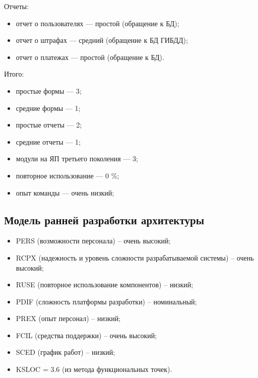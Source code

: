 Отчеты:
\begin{itemize}[label = ---]
    \item отчет о пользователях --- простой (обращение к БД);
    \item отчет о штрафах --- средний (обращение к БД ГИБДД);
    \item отчет о платежах --- простой (обращение к БД).
\end{itemize}

Итого:
\begin{itemize}[label = ---]
    \item простые формы --- 3;
    \item средние формы --- 1;

    \item простые отчеты --- 2;
    \item средние отчеты --- 1;

    \item модули на ЯП третьего поколения --- 3;
    \item повторное использование --- 0 \%;
    \item опыт команды --- очень низкий;
\end{itemize}

\subsection{Модель ранней разработки архитектуры}

\begin{itemize}[label = ---]
\item PERS (возможности персонала) – очень высокий;
\item RCPX (надежность и уровень сложности разрабатываемой системы)
– очень высокий;
\item RUSE (повторное использование компонентов) – низкий;
\item PDIF (сложность платформы разработки) – номинальный;
\item PREX (опыт персонал) – низкий;
\item FCIL (средства поддержки) – очень высокий;
\item SCED (график работ) – низкий;
\item KSLOC = 3.6 (из метода функциональных точек).
\end{itemize}
